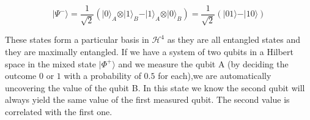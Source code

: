 \begin{equation}
\vert\Psi^{-}\rangle=\frac{1}{\sqrt{2}}(\vert0\rangle_{A} \otimes\vert1\rangle_{B} -\vert1\rangle_{A} \otimes\vert0\rangle_{B})=\frac{1}{\sqrt{2}}(\vert01\rangle-\vert10\rangle)
\end{equation}

These states form a particular basis in $\mathcal{H}^4$ as they are all entangled states and they are maximally entangled. If we have a system of two qubits in a Hilbert space in the mixed state $\vert\Phi^{+}\rangle$ and we measure the qubit A (by deciding the outcome $0$ or $1$ with a probability of $0.5$ for each),we are automatically uncovering the value of the qubit B. In this state we know the second qubit will always yield the same value of the first measured qubit. The second value is correlated with the first one.




